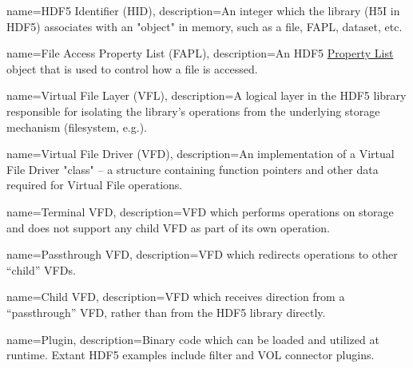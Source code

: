 \makeglossaries

{
        name=HDF5 Identifier (HID),
        description={An integer which the library (H5I in HDF5) associates with an
                     "object" in memory, such as a file, FAPL, dataset, etc.}
}

{
        name=File Access Property List (FAPL),
        description={An HDF5 \href{https://docs.hdfgroup.org/hdf5/develop/group___h5_p.html}{Property List}
                     object that is used to control how a file is accessed.}
}
 
{
        name=Virtual File Layer (VFL),
        description={A logical layer in the HDF5 library responsible for isolating the
                     library's operations from the underlying storage mechanism
                     (filesystem, e.g.).}
}

{
        name=Virtual File Driver (VFD),
        description={An implementation of a Virtual File Driver "class" – a structure
                     containing function pointers and other data required for Virtual File
                     operations.}
}
 
{
        name=Terminal VFD,
        description={VFD which performs operations on storage and does not support
                     any child VFD as part of its own operation.}
}

{
        name=Passthrough VFD,
        description={VFD which redirects operations to other “child” VFDs.}
}

{
        name=Child VFD,
        description={VFD which receives direction from a “passthrough” VFD, rather
                     than from the HDF5 library directly.}
}

{
        name=Plugin,
        description={Binary code which can be loaded and utilized at runtime. Extant
                     HDF5 examples include filter and VOL connector plugins.}
}


 
